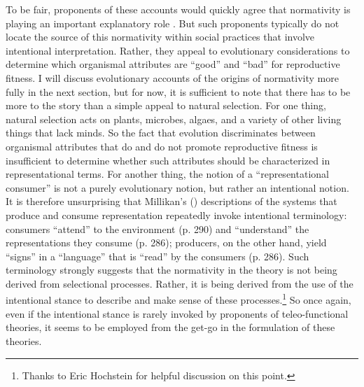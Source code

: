 To be fair, proponents of these accounts would quickly agree that normativity is playing an important explanatory role \citep[e.g.,][]{Millikan:1989,Dennett:1987}. But such proponents typically do not locate the source of this normativity within social practices that involve intentional interpretation. Rather, they appeal to evolutionary considerations to determine which organismal attributes are ``good'' and ``bad'' for reproductive fitness. I will discuss evolutionary accounts of the origins of normativity more fully in the next section, but for now, it is sufficient to note that there has to be more to the story than a simple appeal to natural selection. For one thing, natural selection acts on plants, microbes, algaes, and a variety of other living things that lack minds. So the fact that evolution discriminates between organismal attributes that do and do not promote reproductive fitness is insufficient to determine whether such attributes should be characterized in representational terms. For another thing, the notion of a ``representational consumer'' is not a purely evolutionary notion, but rather an intentional notion. It is therefore unsurprising that Millikan's (\citeyear{Millikan:1989}) descriptions of the systems that produce and consume representation repeatedly invoke intentional terminology: consumers ``attend'' to the environment (p. 290) and ``understand'' the representations they consume (p. 286); producers, on the other hand, yield ``signs'' in a ``language'' that is ``read'' by the consumers (p. 286). Such terminology strongly suggests that the normativity in the theory is not being derived from selectional processes. Rather, it is being derived from the use of the intentional stance to describe and make sense of these processes.\footnote{Thanks to Eric Hochstein for helpful discussion on this point.} So once again, even if the intentional stance is rarely invoked by proponents of teleo-functional theories, it seems to be employed from the get-go in the formulation of these theories.  

